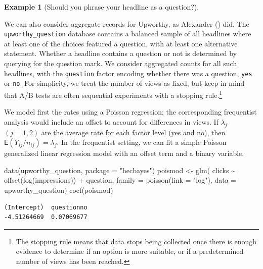 \documentclass[
  11pt,
  letterpaper,
]{scrbook}
\newenvironment{Shaded}{\begin{snugshade}}{\end{snugshade}}
\newcommand{\AttributeTok}[1]{\textcolor[rgb]{0.40,0.45,0.13}{#1}}
\newcommand{\FunctionTok}[1]{\textcolor[rgb]{0.28,0.35,0.67}{#1}}
\newcommand{\NormalTok}[1]{\textcolor[rgb]{0.00,0.23,0.31}{#1}}
\newcommand{\OtherTok}[1]{\textcolor[rgb]{0.00,0.23,0.31}{#1}}
\newcommand{\SpecialCharTok}[1]{\textcolor[rgb]{0.37,0.37,0.37}{#1}}
\newcommand{\StringTok}[1]{\textcolor[rgb]{0.13,0.47,0.30}{#1}}
\theoremstyle{definition}
\newtheorem{example}{Example}[chapter]
\theoremstyle{plain}
\theoremstyle{plain}
\theoremstyle{plain}
\theoremstyle{definition}
\theoremstyle{definition}
\theoremstyle{plain}
\theoremstyle{plain}
\theoremstyle{remark}
\begin{document}
\begin{example}[Should you phrase your headline as a
question?]\protect\hypertarget{exm-poisson-upworthy-question}{}\label{exm-poisson-upworthy-question}

We can also consider aggregate records for Upworthy, as Alexander
() did. The
\texttt{upworthy\_question} database contains a balanced sample of all
headlines where at least one of the choices featured a question, with at
least one alternative statement. Whether a headline contains a question
or not is determined by querying for the question mark. We consider
aggregated counts for all such headlines, with the \texttt{question}
factor encoding whether there was a question, \texttt{yes} or
\texttt{no}. For simplicity, we treat the number of views as fixed, but
keep in mind that A/B tests are often sequential experiments with a
stopping rule.\footnote{The stopping rule means that data stops being
  collected once there is enough evidence to determine if an option is
  more suitable, or if a predetermined number of views has been reached.}

We model first the rates using a Poisson regression; the corresponding
frequentist analysis would include an offset to account for differences
in views. If \(\lambda_{j}\) \((j=1, 2)\) are the average rate for each
factor level (yes and no), then
\(\mathsf{E}(Y_{ij}/n_{ij}) = \lambda_j.\) In the frequentist setting,
we can fit a simple Poisson generalized linear regression model with an
offset term and a binary variable.

\begin{Shaded}
\begin{Highlighting}[]
\FunctionTok{data}\NormalTok{(upworthy\_question, }\AttributeTok{package =} \StringTok{"hecbayes"}\NormalTok{)}
\NormalTok{poismod }\OtherTok{\textless{}{-}} \FunctionTok{glm}\NormalTok{(}
\NormalTok{  clicks }\SpecialCharTok{\textasciitilde{}} \FunctionTok{offset}\NormalTok{(}\FunctionTok{log}\NormalTok{(impressions)) }\SpecialCharTok{+}\NormalTok{ question, }
  \AttributeTok{family =} \FunctionTok{poisson}\NormalTok{(}\AttributeTok{link =} \StringTok{"log"}\NormalTok{),}
  \AttributeTok{data =}\NormalTok{ upworthy\_question)}
\FunctionTok{coef}\NormalTok{(poismod)}
\end{Highlighting}
\end{Shaded}

\begin{verbatim}
(Intercept)  questionno 
-4.51264669  0.07069677 
\end{verbatim}


\end{example}
\end{document}
